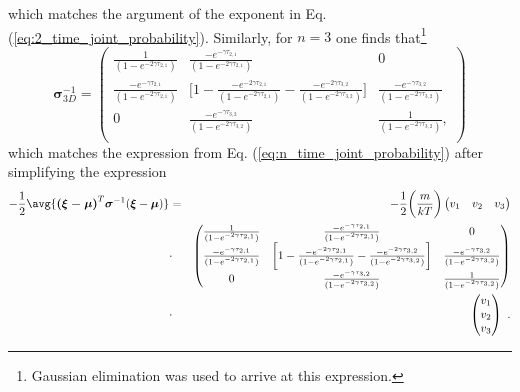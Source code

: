 which matches the argument of the exponent in Eq. (\ref{eq:2_time_joint_probability}). Similarly, for $n=3$ one finds that\footnote{Gaussian elimination was used to arrive at this expression.}
\begin{equation}
\boldsymbol{\sigma}_{3D}^{-1} = \begin{pmatrix}
 \frac{1}{(1-e^{-2 \gamma \tau_{2,1}})} & \frac{-e^{-\gamma	\tau_{2,1}}}{(1-e^{-2 \gamma \tau_{2,1}})} & 0 \\
 \frac{-e^{-\gamma	\tau_{2,1}}}{(1-e^{-2 \gamma \tau_{2,1}})} & \bigg[ 1 - \frac{-e^{-2\gamma	\tau_{2,1}}}{(1-e^{-2 \gamma \tau_{2,1}})} - \frac{-e^{-2\gamma	\tau_{3,2}}}{(1-e^{-2 \gamma \tau_{3,2}})} \bigg] & \frac{-e^{-\gamma	\tau_{3,2}}}{(1-e^{-2 \gamma \tau_{3,2}})} \\
 0 & \frac{-e^{-\gamma	\tau_{3,2}}}{(1-e^{-2 \gamma \tau_{3,2}})} & \frac{1}{(1-e^{-2 \gamma \tau_{3,2}})}, \\
\end{pmatrix}
\end{equation}
which matches the expression from Eq. (\ref{eq:n_time_joint_probability}) after simplifying the expression
\begin{eqnarray}
-\frac{1}{2}\avg{\boldsymbol{(\xi-\boldsymbol{\mu})}^{T} \boldsymbol{\sigma}^{-1} (\boldsymbol{\xi}-\boldsymbol{\mu})} &=& -\frac{1}{2} \bigg( \frac{m}{kT} \bigg) \begin{pmatrix}
 v_1 & v_2 & v_3 \\
\end{pmatrix} \nonumber \\
&\cdot&
 \begin{pmatrix}
 \frac{1}{(1-e^{-2 \gamma \tau_{2,1}})} & \frac{-e^{-\gamma	\tau_{2,1}}}{(1-e^{-2 \gamma \tau_{2,1}})} & 0 \\
 \frac{-e^{-\gamma	\tau_{2,1}}}{(1-e^{-2 \gamma \tau_{2,1}})} & \bigg[ 1 - \frac{-e^{-2\gamma	\tau_{2,1}}}{(1-e^{-2 \gamma \tau_{2,1}})} - \frac{-e^{-2\gamma	\tau_{3,2}}}{(1-e^{-2 \gamma \tau_{3,2}})} \bigg] & \frac{-e^{-\gamma	\tau_{3,2}}}{(1-e^{-2 \gamma \tau_{3,2}})} \nonumber \\
 0 & \frac{-e^{-\gamma	\tau_{3,2}}}{(1-e^{-2 \gamma \tau_{3,2}})} & \frac{1}{(1-e^{-2 \gamma \tau_{3,2}})} \\
\end{pmatrix} \nonumber \\
&\cdot& \begin{pmatrix}
 v_1 \\
 v_2 \\
 v_3 \\
\end{pmatrix}~.
\end{eqnarray}




